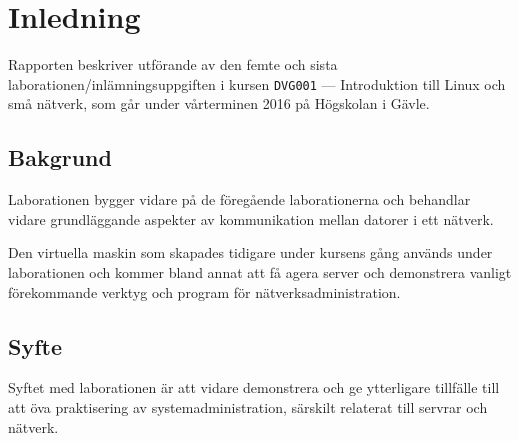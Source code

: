 %
%
%


\section{Inledning}
Rapporten beskriver utförande av den femte och sista
laborationen/inlämningsuppgiften i kursen \texttt{DVG001} --- Introduktion till
Linux och små nätverk, som går under vårterminen 2016 på Högskolan i Gävle.


\subsection{Bakgrund}
Laborationen bygger vidare på de föregående laborationerna och behandlar vidare
grundläggande aspekter av kommunikation mellan datorer i ett nätverk.

Den virtuella maskin som skapades tidigare under kursens gång används under
laborationen och kommer bland annat att få agera server och demonstrera vanligt
förekommande verktyg och program för nätverksadministration.

\subsection{Syfte}
Syftet med laborationen är att vidare demonstrera och ge ytterligare tillfälle
till att öva praktisering av systemadministration, särskilt relaterat till
servrar och nätverk.

